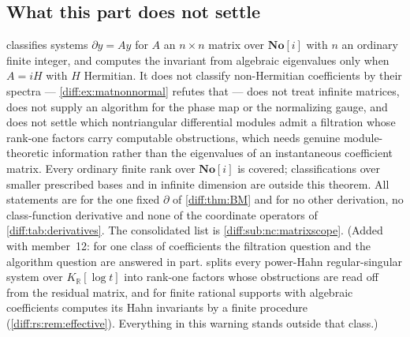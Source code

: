\documentclass[11pt,letterpaper]{article}
\numberwithin{equation}{section}
\theoremstyle{definition}
\theoremstyle{remark}
\newcommand{\SC}{\mathbf{No}[i]}
\newcommand{\R}{\mathbb R}
\newcommand{\der}{\partial}
\newcommand{\KR}{K_{\R}}
\begin{document}
\subsection{What this part does not settle}
\label{diff:sub:matlimits}

\begin{warning}
\label{diff:warn:matlimits}
 classifies systems $\der y=Ay$ for $A$ an $n\times n$
matrix over $\SC$ with $n$ an ordinary finite integer, and computes the
invariant from algebraic eigenvalues only when $A=iH$ with $H$ Hermitian. It
does not classify non-Hermitian coefficients by their spectra ---
\cref{diff:ex:matnonnormal} refutes that --- does not treat infinite matrices,
does not supply an algorithm for the phase map or the normalizing gauge, and
does not settle which nontriangular differential modules admit a filtration
whose rank-one factors carry computable obstructions, which needs genuine
module-theoretic information rather than the eigenvalues of an instantaneous
coefficient matrix. Every ordinary finite rank over $\SC$ is covered;
classifications over smaller prescribed bases and in infinite dimension are
outside this theorem. All statements are for the one fixed $\der$ of
\cref{diff:thm:BM} and for no other derivation, no class-function derivative
and none of the coordinate operators of \cref{diff:tab:derivatives}. The
consolidated list is \cref{diff:sub:nc:matrixscope}. (Added with member~12: for
one class of coefficients the filtration question and the algorithm question are
answered in part.  splits every power-Hahn regular-singular
system over $\KR[\log t]$ into rank-one factors whose obstructions are read off
from the residual matrix, and for finite rational supports with algebraic
coefficients computes its Hahn invariants by a finite procedure
(\cref{diff:rs:rem:effective}). Everything in
this warning stands outside that class.)
\end{warning}
\end{document}
